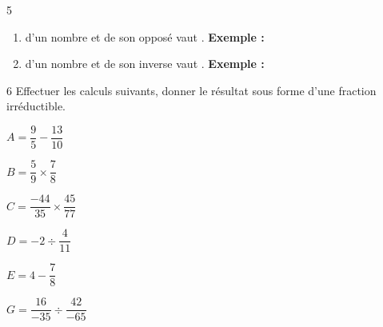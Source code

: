 \documentclass[a4paper]{book}
\begin{document}
{\begin{exerciceNote}{5}
\begin{enumerate}
            \begin{enumerate}
                \item \points[5] d'un nombre et de son opposé vaut \points[3]. \quad \textbf{Exemple : } \points[10]

                \medskip

                \item \points[5] d'un nombre et de son inverse vaut \points[3]. \quad \textbf{Exemple : } \points[10]
            \end{enumerate}
        \end{enumerate}   
    \end{exerciceNote}


    \begin{exerciceNote}{6}
        Effectuer les calculs suivants, donner le résultat sous forme d'une fraction irréductible.

        \begin{minipage}{0.24\linewidth}
            $A = \dfrac{9}{5} - \dfrac{13}{10}$
            \vspace{4cm}
        \end{minipage}
        \hfill\vline\hfill
        \begin{minipage}{0.24\linewidth}
            $B = \dfrac{5}{9}\times\dfrac{7}{8}$
            \vspace{4cm}
        \end{minipage}        
        \hfill\vline\hfill
        \begin{minipage}{0.24\linewidth}
            $C = \dfrac{-44}{35} \times \dfrac{45}{77}$
            \vspace{4cm}
        \end{minipage}
        \hfill\vline\hfill
        \begin{minipage}{0.24\linewidth}
            $D = -2 \div \dfrac{4}{11}$
            \vspace{4cm}
        \end{minipage}

        \vspace{1cm}

        \begin{minipage}{0.45\linewidth}
            $E = 4 - \dfrac{7}{8}$
            \vspace{4cm}
        \end{minipage}
        \hfill\vline\hfill
        \begin{minipage}{0.45\linewidth}
            $G = \dfrac{16}{-35}\div\dfrac{42}{-65}$
            \vspace{4cm}
        \end{minipage}        
    \end{exerciceNote}

}
\end{document}
